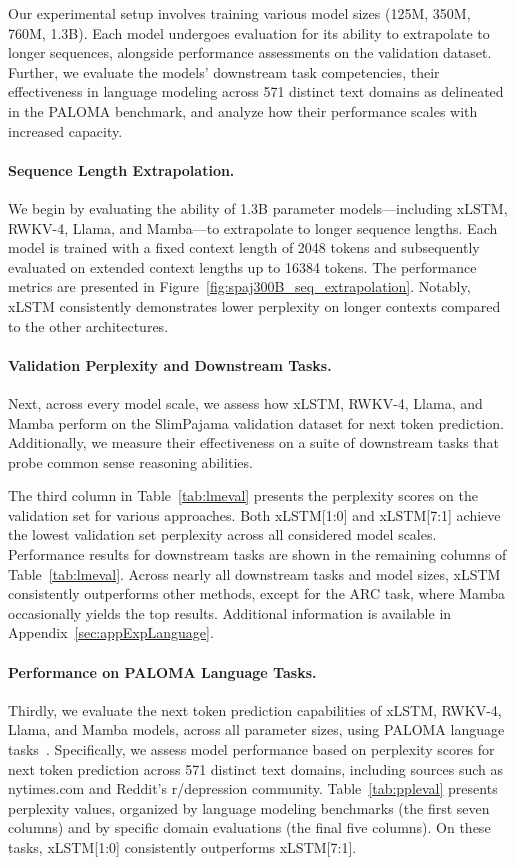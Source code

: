 Our experimental setup involves training various model sizes (125M, 350M, 760M, 1.3B). Each model undergoes evaluation for its ability to extrapolate to longer sequences, alongside performance assessments on the validation dataset. Further, we evaluate the models' downstream task competencies, their effectiveness in language modeling across 571 distinct text domains as delineated in the PALOMA benchmark, and analyze how their performance scales with increased capacity.

\paragraph{Sequence Length Extrapolation.}
\label{sec:spaj300B_ctx_extrapolation}
We begin by evaluating the ability of 1.3B parameter models—including xLSTM, RWKV-4, Llama, and Mamba—to extrapolate to longer sequence lengths. Each model is trained with a fixed context length of 2048 tokens and subsequently evaluated on extended context lengths up to 16384 tokens. The performance metrics are presented in Figure~\ref{fig:spaj300B_seq_extrapolation}. Notably, xLSTM consistently demonstrates lower perplexity on longer contexts compared to the other architectures.

\paragraph{Validation Perplexity and Downstream Tasks.}
\label{sec:spaj_downstream_eval}
Next, across every model scale, we assess how xLSTM, RWKV-4, Llama, and Mamba perform on the SlimPajama validation dataset for next token prediction. Additionally, we measure their effectiveness on a suite of downstream tasks that probe common sense reasoning abilities.

The third column in Table~\ref{tab:lmeval} presents the perplexity scores on the validation set for various approaches. Both xLSTM[1:0] and xLSTM[7:1] achieve the lowest validation set perplexity across all considered model scales. Performance results for downstream tasks are shown in the remaining columns of Table~\ref{tab:lmeval}. Across nearly all downstream tasks and model sizes, xLSTM consistently outperforms other methods, except for the ARC task, where Mamba occasionally yields the top results. Additional information is available in Appendix~\ref{sec:appExpLanguage}.

\paragraph{Performance on PALOMA Language Tasks.} Thirdly, we evaluate the next token prediction capabilities of xLSTM, RWKV-4, Llama, and Mamba models, across all parameter sizes, using PALOMA language tasks~\citep{Magnusson:23arxivshort}. Specifically, we assess model performance based on perplexity scores for next token prediction across 571 distinct text domains, including sources such as nytimes.com and Reddit's r/depression community. Table~\ref{tab:ppleval} presents perplexity values, organized by language modeling benchmarks (the first seven columns) and by specific domain evaluations (the final five columns). On these tasks, xLSTM[1:0] consistently outperforms xLSTM[7:1].

